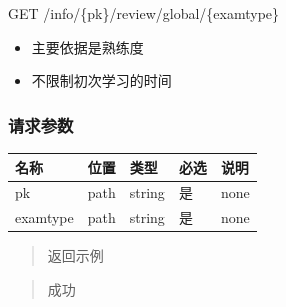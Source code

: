 \documentclass[
]{article}
\begin{document}
GET /info/\{pk\}/review/global/\{examtype\}

\begin{itemize}
\item
  主要依据是熟练度
\item
  不限制初次学习的时间
\end{itemize}

\hypertarget{ux8bf7ux6c42ux53c2ux6570-41}{%
\subsubsection{请求参数}\label{ux8bf7ux6c42ux53c2ux6570-41}}

\begin{longtable}[]{@{}lllll@{}}
\toprule
名称 & 位置 & 类型 & 必选 & 说明 \\
\midrule
\endhead
pk & path & string & 是 & none \\
examtype & path & string & 是 & none \\
\bottomrule
\end{longtable}

\begin{quote}
返回示例
\end{quote}

\begin{quote}
成功
\end{quote}
\end{document}
